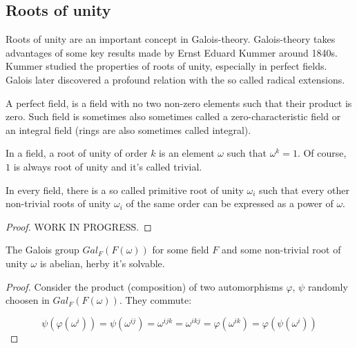 \subsection{Roots of unity}
Roots of unity are an important concept in Galois-theory. Galois-theory 
takes advantages of some key results made by Ernst Eduard Kummer around 1840s. Kummer 
studied the properties of roots of unity, especially in perfect fields. Galois later 
discovered a profound relation with the so called radical extensions. 

\begin{definition}
    A perfect field, is a field with no two non-zero elements such that their 
    product is zero. Such field is sometimes also sometimes called a zero-characteristic
    field or an integral field (rings are also sometimes called integral).  
\end{definition}
\vspace{0.2em}

\begin{definition}
    In a field, a root of unity of order $k$ is an element $\omega$ such that 
    $\omega^k = 1$. Of course, $1$ is always root of unity and it's called 
    trivial.  
\end{definition}
\vspace{0.2em}

\begin{lemma}
\label{lem:RootsOfUnityCyclic}
    In every field, there is a so called primitive root of unity $\omega_i$ such that every 
    other non-trivial roots of unity $\omega_i$ of the same order can be expressed as 
    a power of $\omega$. 
\end{lemma}
\begin{proof}
    WORK IN PROGRESS.
\end{proof}    
\vspace{0.2em}

\begin{lemma}
\label{lem:FOmegaSolvable}
    The Galois group $Gal_{F}(F(\omega))$ for some field $F$ and some 
    non-trivial root of unity $\omega$ is abelian, herby it's solvable. 
\end{lemma}
\begin{proof}
    Consider the product (composition) of two automorphisms $\varphi$, $\psi$ 
    randomly choosen in $Gal_{F}(F(\omega))$. They commute:

    $$ \psi(\varphi(\omega^i)) = \psi(\omega^{ij}) = \omega^{ijk} = 
    \omega^{ikj} = \varphi(\omega^{ik}) = \varphi(\psi(\omega^i)) $$
\end{proof}

\newpage
